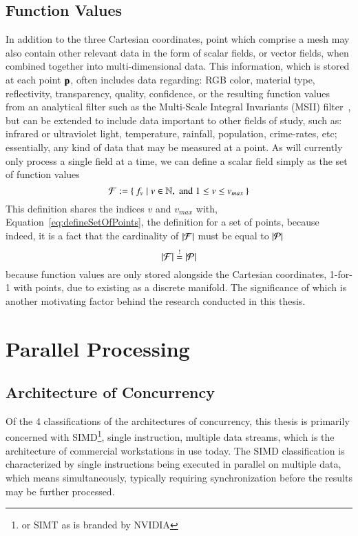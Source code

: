 \subsection{Function Values}
\label{ch2s3ssFV}
In addition to the three Cartesian coordinates, point which comprise a mesh may also contain other relevant data in the form of scalar fields, or vector fields, when combined together into multi-dimensional data. This information, which is stored at each point $\mathbf{p}$, often includes data regarding: RGB color, material type, reflectivity, transparency, quality, confidence, or the resulting function values from an analytical filter such as the Multi-Scale Integral Invariants (MSII) filter~\cite[p.~21]{Mara12}, but can be extended to include data important to other fields of study, such as: infrared or ultraviolet light, temperature, rainfall, population, crime-rates, etc; essentially, any kind of data that may be measured at a point. As  will currently only process a single field at a time, we can define a scalar field simply as the set of function values
%
\begin{equation}
	\mathcal{F} := \left \{\: f_v \mid v \in \mathbb{N}, \;\text{and}\; 1\leq v \leq v_{max} \:\right \}
	\label{eq:defineSetOfFunctionValues}
\end{equation}%
%
%
%
This definition shares the indices $v$ and $v_{max}$ with, Equation~\ref{eq:defineSetOfPoints}, the definition for a set of points, because indeed, it is a fact that the cardinality of $|\mathcal{F}|$ must be equal to $|\mathcal{P}|$
%
\begin{equation}
	|\mathcal{F}| \overset{!}{=} |\mathcal{P}|
\end{equation}
%
because function values are only stored alongside the Cartesian coordinates, 1-for-1 with points, due to \tdd{} existing as a discrete manifold. The significance of which is another motivating factor behind the research conducted in this thesis.

%
%
%
%
%
%
\section{Parallel Processing}
\label{ch2sPP}

%
%
%
%
\subsection{Architecture of Concurrency} %
Of the 4 classifications of the architectures of concurrency, this thesis is primarily concerned with SIMD\footnote{or SIMT as is branded by NVIDIA}, single instruction, multiple data streams, which is the architecture of commercial workstations in use today. The SIMD classification is characterized by single instructions being executed in parallel on multiple data, which means simultaneously, typically requiring synchronization before the results may be further processed.

